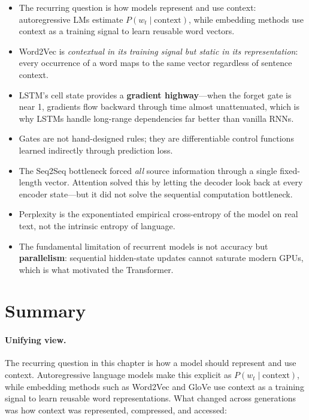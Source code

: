\begin{takeaways}
\begin{itemize}[leftmargin=1.2em, itemsep=4pt]
  \item The recurring question is how models represent and use context: autoregressive LMs estimate $P(w_t \mid \text{context})$, while embedding methods use context as a training signal to learn reusable word vectors.
  \item Word2Vec is \emph{contextual in its training signal but static in its representation}: every occurrence of a word maps to the same vector regardless of sentence context.
  \item LSTM's cell state provides a \textbf{gradient highway}—when the forget gate is near 1, gradients flow backward through time almost unattenuated, which is why LSTMs handle long-range dependencies far better than vanilla RNNs.
  \item Gates are not hand-designed rules; they are differentiable control functions learned indirectly through prediction loss.
  \item The Seq2Seq bottleneck forced \emph{all} source information through a single fixed-length vector. Attention solved this by letting the decoder look back at every encoder state—but it did not solve the sequential computation bottleneck.
  \item Perplexity is the exponentiated empirical cross-entropy of the model on real text, not the intrinsic entropy of language.
  \item The fundamental limitation of recurrent models is not accuracy but \textbf{parallelism}: sequential hidden-state updates cannot saturate modern GPUs, which is what motivated the Transformer.
\end{itemize}
\end{takeaways}

\section{Summary}

\paragraph{Unifying view.} The recurring question in this chapter is how a model should represent and use context. Autoregressive language models make this explicit as $P(w_t \mid \text{context})$, while embedding methods such as Word2Vec and GloVe use context as a training signal to learn reusable word representations. What changed across generations was how context was represented, compressed, and accessed:

